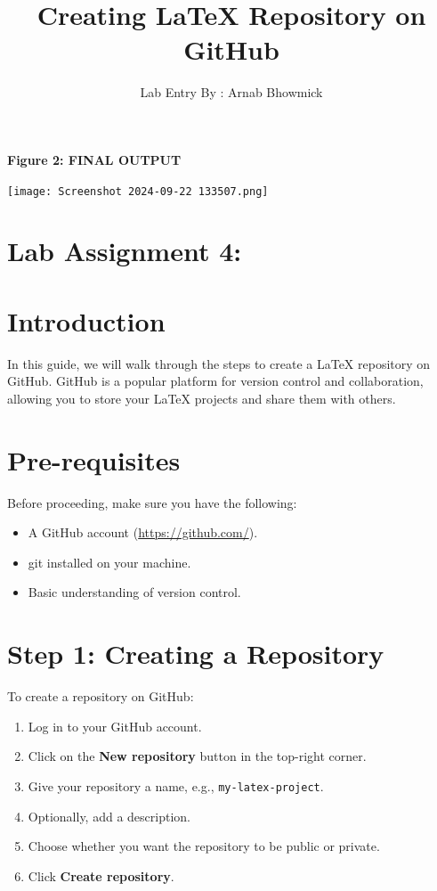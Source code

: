 \documentclass[a4paper,14pt]{article}
\begin{document}
\begin{center}
\noindent\textbf{Figure 2: FINAL OUTPUT}
\end{center}
\vspace{10pt}

\begin{center}
\texttt{[image: Screenshot 2024-09-22 133507.png]} \\[5pt]
\end{center}


\title{Creating LaTeX Repository on GitHub}
\author{Lab Entry By : Arnab Bhowmick}
\date{}

\maketitle

\section*{Lab Assignment 4:}

\section{Introduction}
In this guide, we will walk through the steps to create a LaTeX repository on GitHub. GitHub is a popular platform for version control and collaboration, allowing you to store your LaTeX projects and share them with others.

\section{Pre-requisites}
Before proceeding, make sure you have the following:
\begin{itemize}
    \item A GitHub account (\url{https://github.com/}).
    \item git installed on your machine.
    \item Basic understanding of version control.
\end{itemize}

\section{Step 1: Creating a Repository}
To create a repository on GitHub:
\begin{enumerate}
    \item Log in to your GitHub account.
    \item Click on the \textbf{New repository} button in the top-right corner.
    \item Give your repository a name, e.g., \texttt{my-latex-project}.
    \item Optionally, add a description.
    \item Choose whether you want the repository to be public or private.
    \item Click \textbf{Create repository}.
\end{enumerate}
\end{document}
